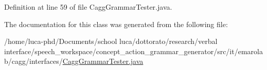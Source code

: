 Definition at line 59 of file Cagg\-Grammar\-Tester.\-java.



The documentation for this class was generated from the following file\-:\begin{DoxyCompactItemize}
\item 
/home/luca-\/phd/\-Documents/school luca/dottorato/research/verbal interface/speech\-\_\-workspace/concept\-\_\-action\-\_\-grammar\-\_\-generator/src/it/emarolab/cagg/interfaces/\hyperlink{CaggGrammarTester_8java}{Cagg\-Grammar\-Tester.\-java}\end{DoxyCompactItemize}
